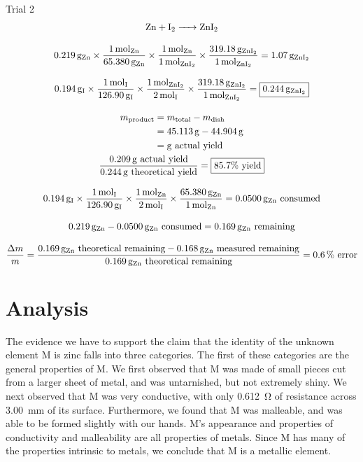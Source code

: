 \documentclass[titlepage]{article}
\begin{document}
\large{Trial 2}
\begin{gather*}
    \ce{Zn + I2 -> ZnI2} \\[2ex]
    \qty{0.219}{\gram\of{Zn}}\times\frac{\qty{1}{\mol\of{Zn}}}{\qty{65.380}{\gram\of{Zn}}}\times\frac{\qty{1}{\mol\of{Zn}}}{\qty{1}{\mol\of{\ce{ZnI2}}}}\times\frac{\qty{319.18}{\gram\of{\ce{ZnI2}}}}{\qty{1}{\mol\of{\ce{ZnI2}}}}=\qty{1.07}{\gram\of{\ce{ZnI2}}} \\[2ex]
    \qty{0.194}{\gram\of{I}}\times\frac{\qty{1}{\mol\of{I}}}{\qty{126.90}{\gram\of{I}}}\times\frac{\qty{1}{\mol\of{\ce{ZnI2}}}}{\qty{2}{\mol\of{I}}}\times\frac{\qty{319.18}{\gram\of{\ce{ZnI2}}}}{\qty{1}{\mol\of{\ce{ZnI2}}}}=\boxed{\qty{0.244}{\gram\of{\ce{ZnI2}}}} \\[2ex]
    \begin{split}
    m_{\text{product}} &= m_{\text{total}} - m_{\text{dish}} \\
                       &= \qty{45.113}{\gram} - \qty{44.904}{\gram} \\
                       &= \qty{}{\gram} \text{ actual yield} \\
    \end{split} \\
    \frac{\qty{0.209}{\gram}\mathrm{\ actual\ yield}}{\qty{0.244}{\gram}\mathrm{\ theoretical\ yield}}=\boxed{85.7\unit{\percent}\mathrm{\ yield}} \\[2ex]
    \qty{0.194}{\gram\of{I}}\times\frac{\qty{1}{\mol\of{I}}}{\qty{126.90}{\gram\of{I}}}\times\frac{\qty{1}{\mol\of{Zn}}}{\qty{2}{\mol\of{I}}}\times\frac{\qty{65.380}{\gram\of{Zn}}}{\qty{1}{\mol\of{Zn}}}=\qty{0.0500}{\gram\of{Zn}}\text{ consumed} \\[2ex]
    \qty{0.219}{\gram\of{Zn}}-\qty{0.0500}{\gram\of{Zn}}\text{ consumed}=\qty{0.169}{\gram\of{Zn}}\text{ remaining} \\[2ex]
    \frac{\Delta m}{m}=\frac{\qty{0.169}{\gram\of{Zn}}\text{ theoretical remaining}-\qty{0.168}{\gram\of{Zn}}\text{ measured remaining}}{\qty{0.169}{\gram\of{Zn}}\text{ theoretical remaining}}=\qty{0.6}{\percent}\text{ error}
\end{gather*}

\section{Analysis}

The evidence we have to support the claim that the identity of the unknown element M is zinc falls into three categories. The first of these categories are the general properties of M. We first observed that M was made of small pieces cut from a larger sheet of metal, and was untarnished, but not extremely shiny. We next observed that M was very conductive, with only \qty{0.612}{\ohm} of resistance across \qty{3.00}{\milli\meter} of its surface. Furthermore, we found that M was malleable, and was able to be formed slightly with our hands. M's appearance and properties of conductivity and malleability are all properties of metals. Since M has many of the properties intrinsic to metals, we conclude that M is a metallic element. 
\end{document}
